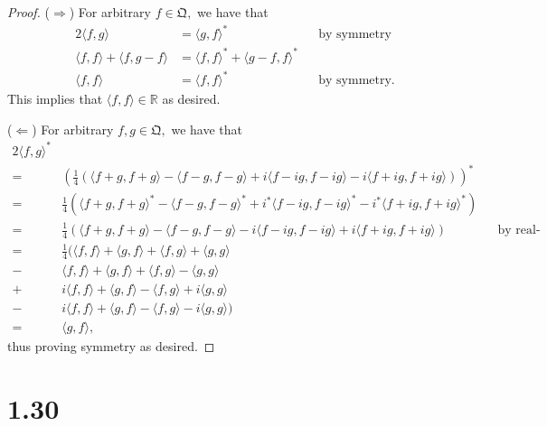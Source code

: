 \documentclass[10pt]{article}
\begin{document}
\begin{proof}
    ($\Rightarrow$) For arbitrary $f\in\mathfrak{Q},$ we have that
    \begin{alignat*}{2}
        \langle f,g\rangle &= \langle g,f\rangle^*  \qquad\qquad&&\text{by symmetry}\\
        \langle f,f\rangle + \langle f,g-f\rangle &= \langle f,f\rangle^* + \langle g-f,f\rangle^*\\
        \langle f,f\rangle &= \langle f,f\rangle^* &&\text{by symmetry.}
    \end{alignat*}
    This implies that $\langle f,f\rangle\in\mathbb{R}$ as desired.

    ($\Leftarrow$) For arbitrary $f,g\in\mathfrak{Q},$ we have that
    \begin{alignat*}{2}
        \langle f,g\rangle^*&\\
        =& \left (\frac{1}{4}(\langle f+g,f+g\rangle-\langle f-g,f-g\rangle + i\langle f-ig, f-ig\rangle -i\langle f+ig, f+ig\rangle)\right )^*\\
        =& \frac{1}{4}(\langle f+g,f+g\rangle^*-\langle f-g,f-g\rangle^* + i^*\langle f-ig, f-ig\rangle^* -i^*\langle f+ig, f+ig\rangle^*)\\
        =& \frac{1}{4}(\langle f+g,f+g\rangle-\langle f-g,f-g\rangle - i\langle f-ig, f-ig\rangle +i\langle f+ig, f+ig\rangle) &&\text{by real-val asmptn.}\\
        =&\frac{1}{4}(\langle f,f\rangle + \langle g,f\rangle + \langle f,g\rangle + \langle g,g\rangle\\
         -&\langle f,f\rangle + \langle g,f\rangle +\langle f,g\rangle -\langle g,g\rangle\\
        +&i\langle f,f\rangle + \langle g,f\rangle -\langle f,g\rangle +i\langle g,g\rangle\\
        -&i\langle f,f\rangle + \langle g,f\rangle - \langle f,g\rangle -i\langle g,g\rangle)\\
        =& \langle g,f\rangle,
    \end{alignat*}
    thus proving symmetry as desired.
\end{proof}

\section*{1.30}
\end{document}
